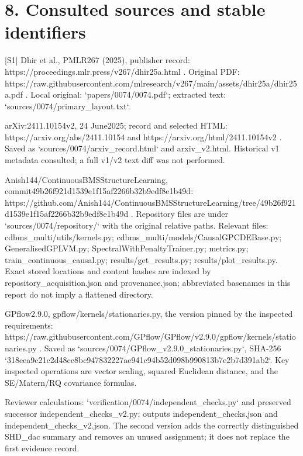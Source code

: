 \documentclass[10pt]{article}
\begin{document}
\section*{8. Consulted sources and stable identifiers}
[S1] Dhir et al., PMLR267 (2025), publisher record: https://proceedings.mlr.press/v267/dhir25a.html . Original PDF: https://raw.githubusercontent.com/mlresearch/v267/main/assets/dhir25a/dhir25a.pdf . Local original: `papers/0074/0074.pdf`; extracted text: `sources/0074/primary\_layout.txt`.\par
[S2] arXiv:2411.10154v2, 24 June2025; record and selected HTML: https://arxiv.org/abs/2411.10154 and https://arxiv.org/html/2411.10154v2 . Saved as `sources/0074/arxiv\_record.html` and arxiv\_v2.html. Historical v1 metadata consulted; a full v1/v2 text diff was not performed.\par
[S3] Anish144/ContinuousBMSStructureLearning, commit49b26f921d1539e1f15af2266b32b9edf8e1b49d: https://github.com/Anish144/ContinuousBMSStructureLearning/tree/49b26f921d1539e1f15af2266b32b9edf8e1b49d . Repository files are under `sources/0074/repository/` with the original relative paths. Relevant files: cdbms\_multi/utils/kernels.py; cdbms\_multi/models/CausalGPCDEBase.py; GeneralisedGPLVM.py; SpectralWithPenaltyTrainer.py; metrics.py; train\_continuous\_causal.py; results/get\_results.py; results/plot\_results.py. Exact stored locations and content hashes are indexed by repository\_acquisition.json and provenance.json; abbreviated basenames in this report do not imply a flattened directory.\par
[S4] GPflow2.9.0, gpflow/kernels/stationaries.py, the version pinned by the inspected requirements: https://raw.githubusercontent.com/GPflow/GPflow/v2.9.0/gpflow/kernels/stationaries.py . Saved as `sources/0074/GPflow\_v2.9.0\_stationaries.py`, SHA-256 `318eea9c21c2d48cc8bc947832227ae941c94b52d098b990813b7e2b7d391ab2`. Key inspected operations are vector scaling, squared Euclidean distance, and the SE/Matern/RQ covariance formulas.\par
[C1] Reviewer calculations: `verification/0074/independent\_checks.py` and preserved successor independent\_checks\_v2.py; outputs independent\_checks.json and independent\_checks\_v2.json. The second version adds the correctly distinguished SHD\_dac summary and removes an unused assignment; it does not replace the first evidence record.\par
\end{document}
